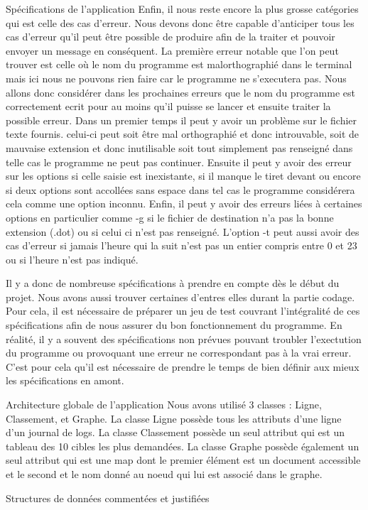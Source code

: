 \documentclass{article}
\begin{document}
\begin{section}{Spécifications de l'application}
Enfin, il nous reste encore la plus grosse catégories qui est celle des cas d'erreur. Nous devons donc être capable d'anticiper tous les cas d'erreur qu'il peut être possible de produire afin de la traiter et pouvoir envoyer un message en conséquent.
La première erreur notable que l'on peut trouver est celle où le nom du programme est malorthographié dans le terminal mais ici nous ne pouvons rien faire car le programme ne s'executera pas. Nous allons donc considérer dans les prochaines erreurs que le nom du programme est correctement ecrit pour au moins qu'il puisse se lancer et ensuite traiter la possible erreur.
Dans un premier temps il peut y avoir un problème sur le fichier texte fournis. celui-ci peut soit être mal orthographié et donc introuvable, soit de mauvaise extension et donc inutilisable soit tout simplement pas renseigné dans telle cas le programme ne peut pas continuer.
Ensuite il peut y avoir des erreur sur les options si celle saisie est inexistante, si il manque le tiret devant ou encore si deux options sont accollées sans espace dans tel cas le programme considérera cela comme une option inconnu.
Enfin, il peut y avoir des erreurs liées à certaines options en particulier comme -g si le fichier de destination n'a pas la bonne extension (.dot) ou si celui ci n'est pas renseigné. L'option -t peut aussi avoir des cas d'erreur si jamais l'heure qui la suit n'est pas un entier compris entre 0 et 23 ou si l'heure n'est pas indiqué.

Il y a donc de nombreuse spécifications à prendre en compte dès le début du projet. Nous avons aussi trouver certaines d'entres elles durant la partie codage. Pour cela, il est nécessaire de préparer un jeu de test couvrant l'intégralité de ces spécifications afin de nous assurer du bon fonctionnement du programme.
En réalité, il y a souvent des spécifications non prévues  pouvant troubler l'exectution du programme ou provoquant une erreur ne correspondant pas à la vrai erreur. C'est pour cela qu'il est nécessaire de prendre le temps de bien définir aux mieux les spécifications en amont.
\end{section}

\begin{section}{Architecture globale de l'application}
Nous avons utilisé 3 classes : Ligne, Classement, et Graphe. La classe Ligne possède tous les attributs d'une ligne d'un journal de logs. La classe Classement possède un seul attribut qui est un tableau des 10 cibles les plus demandées. La classe Graphe possède également un seul attribut qui est une map dont le premier élément est un document accessible et le second et le nom donné au noeud qui lui est associé dans le graphe.
\end{section}


\begin{section}{Structures de données commentées et justifiées}

\end{section}
\end{document}
